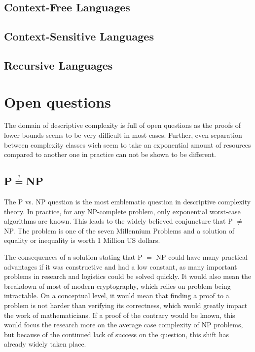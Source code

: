 \subsection{Context-Free Languages}\label{subsec:des-context-free-languages}

\subsection{Context-Sensitive Languages}\label{subsec:des-context-sensitive-languages}

\subsection{Recursive Languages}\label{subsec:des-recursive-languages}


\section{Open questions}\label{sec:open-questions}

The domain of descriptive complexity is full of open questions as the proofs of lower bounds seems to be very difficult in most cases.
Further, even separation between complexity classes wich seem to take an exponential amount of resources compared to another one in practice can not be shown to be different.

\subsection{P$\overset{?}{=}$NP}\label{subsec:pnp}
The P vs. NP question is the most emblematic question in descriptive complexity theory.
In practice, for any NP-complete problem, only exponential worst-case algorithms are known.
This leads to the widely believed conjuncture that P $\neq$ NP.
The problem is one of the seven Millennium Problems and a solution of equality or inequality is worth 1 Million US dollars.

The consequences of a solution stating that P $=$ NP could have many practical advantages if it was constructive and had a low constant, as many important problems in research and logistics could be solved quickly.
It would also mean the breakdown of most of modern cryptography, which relies on problem being intractable.
On a conceptual level, it would mean that finding a proof to a problem is not harder than verifying its correctness, which would greatly impact the work of mathematicians.
If a proof of the contrary would be known, this would focus the research more on the average case complexity of NP problems, but because of the continued lack of success on the question, this shift has already widely taken place.

